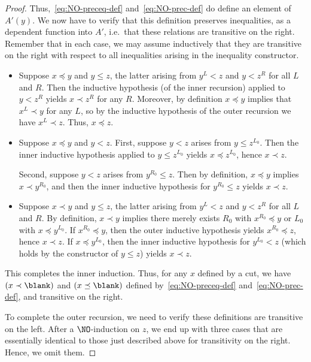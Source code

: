 \begin{proof}
  Thus,~\eqref{eq:NO-preceq-def} and~\eqref{eq:NO-prec-def} do define an element of $A'(y)$.
  We now have to verify that this definition preserves inequalities, as a dependent function into $A'$, i.e.\ that these relations are transitive on the right.
  Remember that in each case, we may assume inductively that they are transitive on the right with respect to all inequalities arising in the inequality constructor.
  \begin{itemize}
  \item Suppose $x\preceq y$ and $y\le z$, the latter arising from $y^L<z$ and $y<z^R$ for all $L$ and $R$.
    Then the inductive hypothesis (of the inner recursion) applied to $y<z^R$ yields $x\prec z^R$ for any $R$.
    Moreover, by definition $x\preceq y$ implies that $x^L \prec y$ for any $L$, so by the inductive hypothesis of the outer recursion we have $x^L \prec z$.
    Thus, $x\preceq z$.
  \item Suppose $x\preceq y$ and $y<z$.
    First, suppose $y<z$ arises from $y\le z^{L_0}$.
    Then the inner inductive hypothesis applied to $y\le z^{L_0}$ yields $x \preceq z^{L_0}$, hence $x\prec z$.

    Second, suppose $y<z$ arises from $y^{R_0}\le z$.
    Then by definition, $x\preceq y$ implies $x\prec y^{R_0}$, and then the inner inductive hypothesis for $y^{R_0}\le z$ yields $x\prec z$.
  \item Suppose $x\prec y$ and $y\le z$, the latter arising from $y^L<z$ and $y<z^R$ for all $L$ and $R$.
    By definition, $x\prec y$ implies there merely exists $R_0$ with $x^{R_0}\preceq y$ or $L_0$ with $x\preceq y^{L_0}$.
    If $x^{R_0}\preceq y$, then the outer inductive hypothesis yields $x^{R_0}\preceq z$, hence $x\prec z$.
    If $x\preceq y^{L_0}$, then the inner inductive hypothesis for $y^{L_0}<z$ (which holds by the constructor of $y\le z$) yields $x\prec z$.

  \end{itemize}
  This completes the inner induction.
  Thus, for any $x$ defined by a cut, we have $(x\prec \blank)$ and $(x\preceq \blank)$ defined by~\eqref{eq:NO-preceq-def} and~\eqref{eq:NO-prec-def}, and transitive on the right.

  To complete the outer recursion, we need to verify these definitions are transitive on the left.
  After a $\NO$-induction on $z$, we end up with three cases that are essentially identical to those just described above for transitivity on the right.
  Hence, we omit them.
\end{proof}
